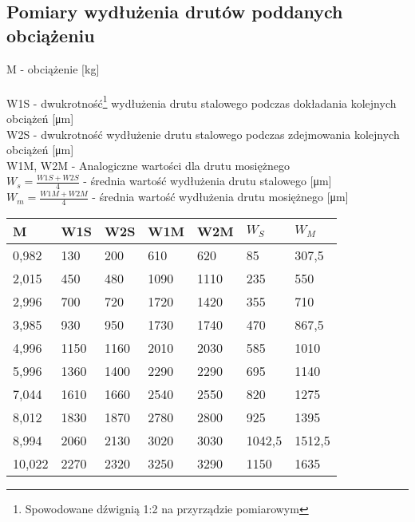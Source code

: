 \documentclass[12pt]{article}
\begin{document}
\subsection{Pomiary wydłużenia drutów poddanych obciążeniu}

M - obciążenie [\si{\kg}]\\\\
W1S - dwukrotność\footnote{Spowodowane dźwignią 1:2 na przyrządzie pomiarowym} wydłużenia drutu stalowego podczas dokładania kolejnych obciążeń [\si{\um}]\\
W2S - dwukrotność wydłużenie drutu stalowego podczas zdejmowania kolejnych obciążeń [\si{\um}]\\
W1M, W2M - Analogiczne wartości dla drutu mosiężnego\\
$W_s = \frac{W1S + W2S}{4}$ - średnia wartość wydłużenia drutu stalowego [\si{\um}]\\
$W_m = \frac{W1M + W2M}{4}$ - średnia wartość wydłużenia drutu mosiężnego [\si{\um}]
\begin{table}[h!]
\centering
\label{my-label}
\begin{tabular}{|l|l|l|l|l|l|l|}
\hline
M & W1S & W2S & W1M & W2M & $W_S$ & $W_M$      \\ \hline
0,982    & 130      & 200      & 610         & 620         & 85             & 307,5           \\ \hline
2,015    & 450      & 480      & 1090        & 1110        & 235            & 550              \\ \hline
2,996    & 700      & 720      & 1720        & 1420        & 355            & 710              \\ \hline
3,985    & 930      & 950      & 1730        & 1740        & 470            & 867,5           \\ \hline
4,996    & 1150     & 1160     & 2010        & 2030        & 585            & 1010             \\ \hline
5,996    & 1360     & 1400     & 2290        & 2290        & 695            & 1140             \\ \hline
7,044    & 1610     & 1660     & 2540        & 2550        & 820            & 1275           \\ \hline
8,012    & 1830     & 1870     & 2780        & 2800        & 925            & 1395           \\ \hline
8,994    & 2060     & 2130     & 3020        & 3030        & 1042,5         & 1512,5          \\ \hline
10,022   & 2270     & 2320     & 3250        & 3290        & 1150           & 1635           \\ \hline
\end{tabular}
\end{table}
\end{document}
